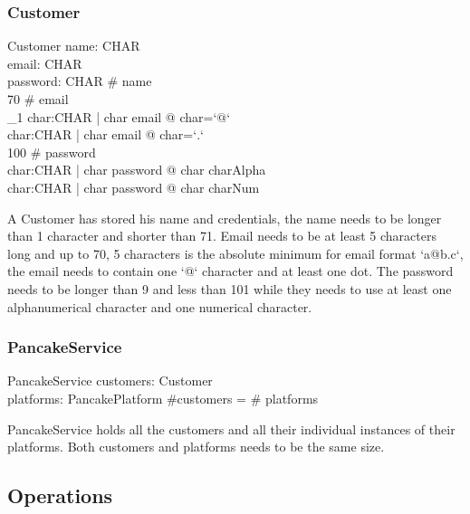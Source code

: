 \documentclass{article}
\begin{document}
\subsubsection{Customer}
\begin{schema}{Customer}
  name: \seq CHAR\\
  email: \seq CHAR\\
  password: \seq CHAR
 \ge \# name  \\
  70 \ge \# email   \\
  \exists_1 char:CHAR | char \in \ran email @ char=`$@$` \\
  \exists char:CHAR | char \in \ran email @ char=`$.$` \\
  100 \ge \# password  \\
  \exists char:CHAR | char \in \ran password @ char \in charAlpha  \\
  \exists char:CHAR | char \in \ran password @ char \in charNum  \\
\end{schema}
A Customer has stored his name and credentials, the name needs to be longer than 1 character and shorter than 71. Email needs to be at least 5 characters long and up to 70, 5 characters is the absolute minimum for email format `a@b.c`, the email needs to contain one `@` character and at least one dot. The password needs to be longer than 9 and less than 101 while they needs to use at least one alphanumerical character and one numerical character.


\label{toc:PancakeService}
\subsubsection{PancakeService}
\begin{schema}{PancakeService}
  customers: \seq Customer \\
  platforms: \seq PancakePlatform 
\where
  \#customers = \# platforms
\end{schema}
PancakeService holds all the customers and all their individual instances of their platforms. Both customers and platforms needs to be the same size.







\newpage
\subsection{Operations}
\end{document}
